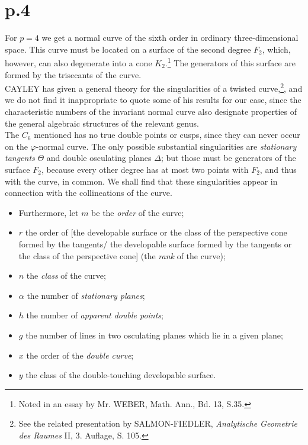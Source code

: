 \documentclass[leqno]{article}
\begin{document}
\section{p.4}
For $ p = 4 $ we get a normal curve of the sixth order in ordinary three-dimensional space. This curve must be located on a surface of the second degree $ F_2 $, which, however, can also degenerate into a cone $ K_2 $.\footnote{Noted in an essay by Mr. WEBER, Math. Ann., Bd. 13, S.35.} The generators of this surface are formed by the trisecants of the curve. \\
CAYLEY has given a general theory for the singularities of a twisted curve,\footnote{See the related presentation by SALMON-FIEDLER, \textit{Analytische Geometrie des Raumes} II, 3. Auflage, S. 105.}, and we do not find it inappropriate to quote some of his results for our case, since the characteristic numbers of the invariant normal curve also designate properties of the general algebraic structures of the relevant genus. \\
The $ C_6 $ mentioned has no true double points or cusps, since they can never occur on the $\varphi$-normal curve. The only possible substantial singularities are \textit{stationary tangents} $ \Theta $ and double osculating planes $ \Delta $; but those must be generators of the surface $ F_2 $, because every other degree has at most two points with $ F_2 $, and thus with the curve, in common. We shall find that these singularities appear in connection with the collineations of the curve. 
\begin{itemize}[label={}]
	\item Furthermore, let $ m $ be the  \textit{order} of the curve; 
	\item $ r $ the order of [the developable surface or the class of the perspective cone formed by the tangents/ the developable surface formed by the tangents or the class of the perspective cone] (the \textit{rank} of the curve);
	\item $ n $ the \textit{class} of the curve;
	\item $\alpha$ the number of \textit{stationary planes};
	\item $ h $ the number of \textit{apparent double points};
	\item $ g $ the number of lines in two osculating planes which lie in a given plane;
	\item $ x $ the order of the \textit{double curve};
	\item $ y $ the class of the double-touching developable surface.
\end{itemize}
\end{document}
